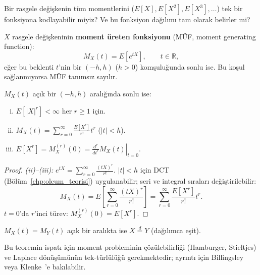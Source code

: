 \begin{kesif}
Bir rasgele değişkenin tüm momentlerini ($E[X], E[X^2], E[X^3], \ldots$) tek bir
fonksiyona kodlayabilir miyiz? Ve bu fonksiyon dağılımı tam olarak belirler mi?
\end{kesif}

\begin{tanim}
\label{def:muf}
$X$ rasgele değişkeninin \textbf{moment üreten fonksiyonu} (MÜF, moment generating function):
\[
  M_X(t) = E[e^{tX}], \qquad t \in \mathbb{R},
\]
eğer bu beklenti $t$'nin bir $(-h, h)$ ($h > 0$) komşuluğunda sonlu ise.
Bu koşul sağlanmıyorsa MÜF tanımsız sayılır.
\end{tanim}

\begin{teorem}
\label{thm:muf_moment}
$M_X(t)$ açık bir $(- h, h)$ aralığında sonlu ise:
\begin{enumerate}[(i)]
  \item $E[|X|^r] < \infty$ her $r \geq 1$ için.
  \item $M_X(t) = \sum_{r=0}^\infty \frac{E[X^r]}{r!} t^r$ ($|t| < h$).
  \item $E[X^r] = M_X^{(r)}(0) = \left.\frac{d^r}{dt^r} M_X(t)\right|_{t=0}$.
\end{enumerate}
\end{teorem}

\begin{proof}
\textit{(ii)--(iii):} $e^{tX} = \sum_{r=0}^\infty \frac{(tX)^r}{r!}$.
$|t| < h$ için DCT (Bölüm~\ref{chp:olcum_teorisi}) uygulanabilir;
seri ve integral sıraları değiştirilebilir:
\[
  M_X(t) = E\!\left[\sum_{r=0}^\infty \frac{(tX)^r}{r!}\right]
  = \sum_{r=0}^\infty \frac{E[X^r]}{r!} t^r.
\]
$t = 0$'da $r$'inci türev: $M_X^{(r)}(0) = E[X^r]$.
\end{proof}

\begin{teorem}
\label{thm:muf_tek}
$M_X(t) = M_Y(t)$ açık bir aralıkta ise $X \stackrel{d}{=} Y$ (dağılımca eşit).
\end{teorem}

Bu teoremin ispatı için moment probleminin çözülebilirliği (Hamburger, Stieltjes)
ve Laplace dönüşümünün tek-türlülüğü gerekmektedir; ayrıntı için Billingsley~\cite{Billingsley1995}
veya Klenke~\cite{Klenke2014}'e bakılabilir.

